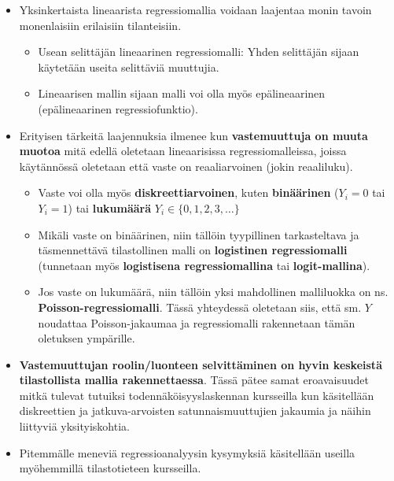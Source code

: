 \documentclass[
]{book}
\providecommand{\tightlist}{%
  \setlength{\itemsep}{0pt}\setlength{\parskip}{0pt}}
\begin{document}
\begin{itemize}
\item
  Yksinkertaista lineaarista regressiomallia voidaan laajentaa monin tavoin monenlaisiin erilaisiin tilanteisiin.

  \begin{itemize}
  \tightlist
  \item
    Usean selittäjän lineaarinen regressiomalli: Yhden selittäjän sijaan käytetään useita selittäviä muuttujia.
  \item
    Lineaarisen mallin sijaan malli voi olla myös epälineaarinen (epälineaarinen regressiofunktio).
  \end{itemize}
\item
  Erityisen tärkeitä laajennuksia ilmenee kun \textbf{vastemuuttuja on muuta muotoa} mitä edellä oletetaan lineaarisissa regressiomalleissa, joissa käytännössä oletetaan että vaste on reaaliarvoinen (jokin reaaliluku).

  \begin{itemize}
  \tightlist
  \item
    Vaste voi olla myös \textbf{diskreettiarvoinen}, kuten \textbf{binäärinen} (\(Y_i=0\) tai \(Y_i=1\)) tai \textbf{lukumäärä} \(Y_i \in \{0,1,2,3,\ldots\}\)
  \item
    Mikäli vaste on binäärinen, niin tällöin tyypillinen tarkasteltava ja täsmennettävä tilastollinen malli on \textbf{logistinen regressiomalli} (tunnetaan myös \textbf{logistisena regressiomallina} tai \textbf{logit-mallina}).
  \item
    Jos vaste on lukumäärä, niin tällöin yksi mahdollinen malliluokka on ns. \textbf{Poisson-regressiomalli}. Tässä yhteydessä oletetaan siis, että sm. \(Y\) noudattaa Poisson-jakaumaa ja regressiomalli rakennetaan tämän oletuksen ympärille.
  \end{itemize}
\item
  \textbf{Vastemuuttujan roolin/luonteen selvittäminen on hyvin keskeistä tilastollista mallia rakennettaessa}. Tässä pätee samat eroavaisuudet mitkä tulevat tutuiksi todennäköisyyslaskennan kursseilla kun käsitellään diskreettien ja jatkuva-arvoisten satunnaismuuttujien jakaumia ja näihin liittyviä yksityiskohtia.
\item
  Pitemmälle meneviä regressioanalyysin kysymyksiä käsitellään useilla myöhemmillä tilastotieteen kursseilla.


\end{itemize}
\end{document}
